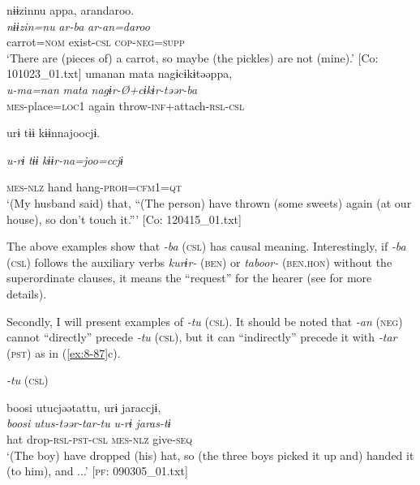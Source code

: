 
{\TM}
\glll  nɨɨzinnu  appa,  arandaroo.\\
\textit{nɨɨzin=nu}  \textit{ar-ba}  \textit{ar-an=daroo}\\
carrot=\textsc{nom}  exist-\textsc{csl}  \textsc{cop}-\textsc{neg}=\textsc{supp}\\
\glt ‘There are (pieces of) a carrot, so maybe (the pickles) are not (mine).’ [Co: 101023\_01.txt]
\ex
{\TM}
\glll  umanan  mata  nagɨcɨkɨtəəppa,\\
\textit{u-ma=nan}  \textit{mata}  \textit{nagɨr-Ø+cɨkɨr-təər-ba}\\
\textsc{mes}-place=\textsc{loc}1  again  throw-\textsc{inf}+attach-\textsc{rsl}-\textsc{csl}

      urɨ  tɨɨ  kɨɨnnajoocjɨ.

      \textit{u-rɨ}  \textit{tɨɨ}  \textit{kɨɨr-na=joo=ccjɨ}

      \textsc{mes}-\textsc{nlz}  hand  hang-\textsc{proh}=\textsc{cfm1}=\textsc{qt}\\
\glt ‘(My husband said) that, “(The person) have thrown (some sweets) again (at our house), so don’t touch it.”’ [Co: 120415\_01.txt]
\z
\z

The above examples show that \textit{-ba} (\textsc{csl}) has causal meaning. Interestingly, if \textit{-ba} (\textsc{csl}) follows the auxiliary verbs \textit{kurɨr-} (\textsc{ben}) or \textit{taboor-} (\textsc{ben}.\textsc{hon}) without the superordinate clauses, it means the “request” for the hearer (see  for more details).

  Secondly, I will present examples of \textit{-tu} (\textsc{csl}). It should be noted that \textit{-an} (\textsc{neg}) cannot “directly” precede \textit{-tu} (\textsc{csl}), but it can “indirectly” precede it with \textit{-tar} (\textsc{pst}) as in (\ref{ex:8-87}c).

\ea\label{ex:8-87}
  \textit{-tu} (\textsc{csl})

\ea
{\TM}
\glll  boosi  utucjəətattu,  urɨ  jaraccjɨ,\\
\textit{boosi}  \textit{utus-təər-tar-tu}  \textit{u-rɨ}  \textit{jaras-tɨ}\\
hat  drop-\textsc{rsl}-\textsc{pst}-\textsc{csl}  \textsc{mes}-\textsc{nlz}  give-\textsc{seq}\\
\glt ‘(The boy) have dropped (his) hat, so (the three boys picked it up and) handed it (to him), and ...’ [\textsc{pf}: 090305\_01.txt]


